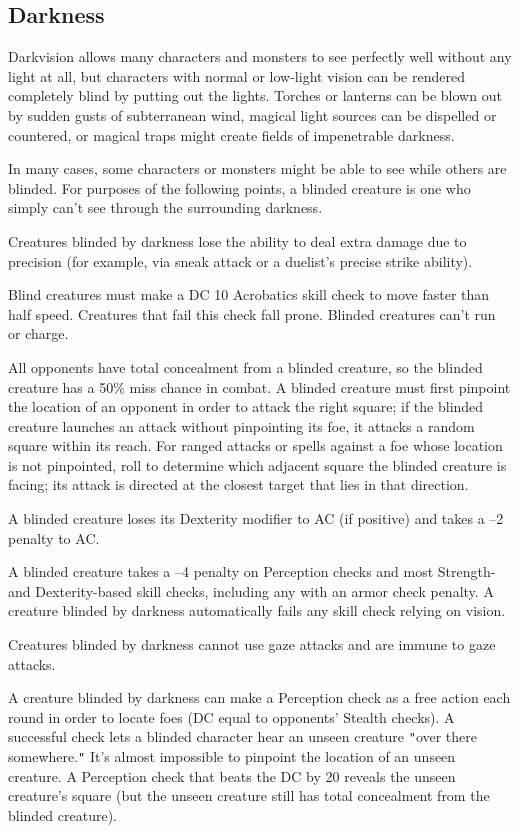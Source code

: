 \subsection{Darkness}

				
Darkvision allows many characters and monsters to see perfectly well without any light at all, but characters with normal or low-light vision can be rendered completely blind by putting out the lights. Torches or lanterns can be blown out by sudden gusts of subterranean wind, magical light sources can be dispelled or countered, or magical traps might create fields of impenetrable darkness.
				
In many cases, some characters or monsters might be able to see while others are blinded. For purposes of the following points, a blinded creature is one who simply can't see through the surrounding darkness.
				
Creatures blinded by darkness lose the ability to deal extra damage due to precision (for example, via sneak attack or a duelist's precise strike ability).
				
Blind creatures must make a DC 10 Acrobatics skill check to move faster than half speed. Creatures that fail this check fall prone. Blinded creatures can't run or charge.
				
All opponents have total concealment from a blinded creature, so the blinded creature has a 50\% miss chance in combat. A blinded creature must first pinpoint the location of an opponent in order to attack the right square; if the blinded creature launches an attack without pinpointing its foe, it attacks a random square within its reach. For ranged attacks or spells against a foe whose location is not pinpointed, roll to determine which adjacent square the blinded creature is facing; its attack is directed at the closest target that lies in that direction.
				
A blinded creature loses its Dexterity modifier to AC (if positive) and takes a --2 penalty to AC.
				
A blinded creature takes a --4 penalty on Perception checks and most Strength- and Dexterity-based skill checks, including any with an armor check penalty. A creature blinded by darkness automatically fails any skill check relying on vision.
				
Creatures blinded by darkness cannot use gaze attacks and are immune to gaze attacks.
				
A creature blinded by darkness can make a Perception check as a free action each round in order to locate foes (DC equal to opponents' Stealth checks). A successful check lets a blinded character hear an unseen creature \texttt{{}"{}}over there somewhere.\texttt{{}"{}} It's almost impossible to pinpoint the location of an unseen creature. A Perception check that beats the DC by 20 reveals the unseen creature's square (but the unseen creature still has total concealment from the blinded creature).
				
